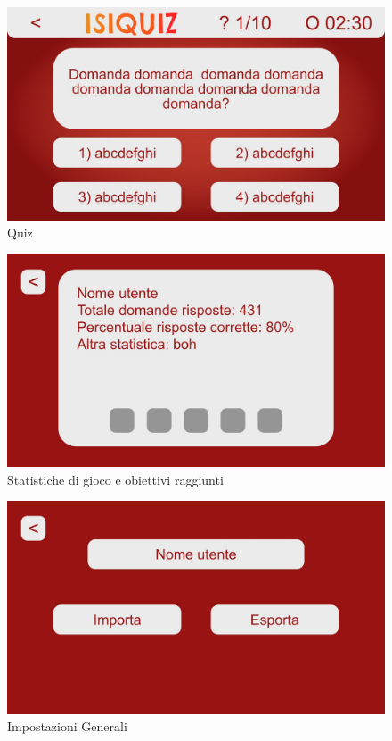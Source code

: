         \begin{figure}[H]
            \centering
            \includegraphics[width=\textwidth]{Images/mockup/quiz1.jpg}
            \caption{Quiz}
            \label{fig:Quiz1}
        \end{figure}
        
        \begin{figure}[H]
            \centering
            \includegraphics[width=\textwidth]{Images/mockup/achivements1.jpg}
            \caption{Statistiche di gioco e obiettivi raggiunti}
            \label{fig:Achievements1}
        \end{figure}
          
        \begin{figure}[H]
            \centering
            \includegraphics[width=\textwidth]{Images/mockup/settings1.jpg}
            \caption{Impostazioni Generali}
            \label{fig:Settings1}
        \end{figure}
        
